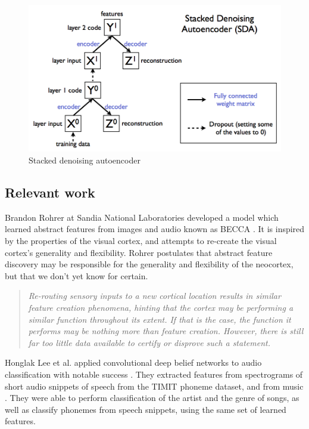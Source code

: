 \documentclass[12pt]{article}
\begin{document}
\begin{doublespacing}
\begin{figure}[p]
\centering
\includegraphics[width=6in]{key1001}  
\caption{Stacked denoising autoencoder}
\label{fig:sda_struct}
\end{figure}

	\subsection{Relevant work}
	Brandon Rohrer at Sandia National Laboratories developed a model which learned abstract features from images and audio known as BECCA \cite{rohrer2011biologically}. It is inspired by the properties of the visual cortex, and attempts to re-create the visual cortex's generality and flexibility. Rohrer postulates that abstract feature discovery may be responsible for the generality and flexibility of the neocortex, but that we don't yet know for certain.

\begin{quote}
\singlespacing
\em Re-routing sensory inputs to a new cortical location results in similar feature creation phenomena, hinting that the cortex may be performing a similar function throughout its extent. If that is the case, the function it performs may be nothing more than feature creation. However, there is still far too little data available to certify or disprove such a statement.
\end{quote}

Honglak Lee et al. applied convolutional deep belief networks to audio classification with notable success \cite{lee2009unsupervised}. They extracted features from spectrograms of short audio snippets of speech from the TIMIT phoneme dataset, and from music \cite{timit}. They were able to perform classification of the artist and the genre of songs, as well as classify phonemes from speech snippets, using the same set of learned features.


\end{doublespacing}
\end{document}
